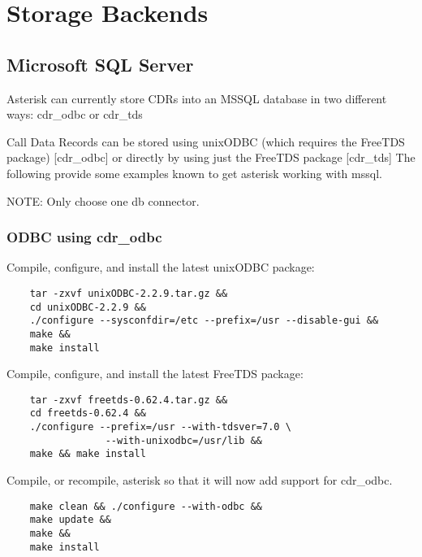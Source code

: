 \section{Storage Backends}

\subsection{Microsoft SQL Server}

	Asterisk can currently store CDRs into an MSSQL database in
	two different ways:  cdr\_odbc or cdr\_tds

	Call Data Records can be stored using unixODBC (which requires
	the FreeTDS package) [cdr\_odbc] or directly by using just the
	FreeTDS package [cdr\_tds]  The following provide some
	examples known to get asterisk working with mssql.

	NOTE:  Only choose one db connector.

\subsubsection{ODBC using cdr\_odbc}
	Compile, configure, and install the latest unixODBC package:
\begin{astlisting}
\begin{verbatim}
	tar -zxvf unixODBC-2.2.9.tar.gz &&
	cd unixODBC-2.2.9 &&
	./configure --sysconfdir=/etc --prefix=/usr --disable-gui &&
	make &&
	make install
\end{verbatim}
\end{astlisting}

	Compile, configure, and install the latest FreeTDS package:
\begin{astlisting}
\begin{verbatim}
	tar -zxvf freetds-0.62.4.tar.gz &&
	cd freetds-0.62.4 &&
	./configure --prefix=/usr --with-tdsver=7.0 \
                 --with-unixodbc=/usr/lib &&
	make && make install
\end{verbatim}
\end{astlisting}

	Compile, or recompile, asterisk so that it will now add support
	for cdr\_odbc.
\begin{astlisting}
\begin{verbatim}
	make clean && ./configure --with-odbc &&
	make update &&
	make &&
	make install
\end{verbatim}
\end{astlisting}

